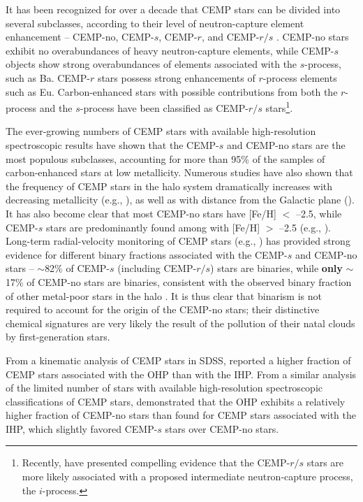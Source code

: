 \documentclass[iop]{emulateapj}
\begin{document}
It has been recognized for over a decade that CEMP stars can be divided
into several subclasses, according to their level of neutron-capture
element enhancement -- CEMP-no, CEMP-$s$, CEMP-$r$, and CEMP-$r/s$
\citep{beers2005}. CEMP-no stars exhibit no overabundances of heavy
neutron-capture elements, while CEMP-$s$ objects show strong
overabundances of elements associated with the $s$-process, such as Ba.
CEMP-$r$ stars possess strong enhancements of $r$-process elements
such as Eu.  Carbon-enhanced stars with possible contributions from
both the $r$-process and the $s$-process have been classified
as CEMP-$r/s$ stars\footnote[8]{Recently, \citet{hampel2016} have
presented compelling evidence that the CEMP-$r/s$ stars are more likely
associated with a proposed intermediate neutron-capture process, the
$i$-process.}.

The ever-growing numbers of CEMP stars with available high-resolution
spectroscopic results have shown that the CEMP-$s$ and CEMP-no stars are
the most populous subclasses, accounting for more than 95\% of the
samples of carbon-enhanced stars at low metallicity. Numerous studies
have also shown that the frequency of CEMP stars in the halo system
dramatically increases with decreasing metallicity (e.g.,
\citealt{lucatello2006, lee2013, yong2013, placco2014}), as well as with
distance from the Galactic plane (\citealt{frebel2006, carollo2012,
beers2016}). It has also become clear that most CEMP-no stars have [Fe/H]
$<$ --2.5, while CEMP-$s$ stars are predominantly found among
with [Fe/H] $>$ --2.5 (e.g., \citealt{aoki2007,
yoon2016}). Long-term radial-velocity monitoring of CEMP stars (e.g.,
\citealt{starkenburg2014, hansen2016a, hansen2016b, jorissen2016}) has provided
strong evidence for different binary fractions associated with the
CEMP-$s$ and CEMP-no stars -- $\sim$82\% of CEMP-$s$ (including
CEMP-$r/s$) stars are binaries, while \textbf{only} $\sim$17\% of CEMP-no stars are
binaries, consistent with the observed binary fraction of other
metal-poor stars in the halo \citep{carney2003}. It is thus clear
that binarism is not required to account for the origin of the CEMP-no
stars; their distinctive chemical signatures are very likely the result
of the pollution of their natal clouds by first-generation stars.

From a kinematic analysis of CEMP stars in SDSS, \citet{carollo2012}
reported a higher fraction of CEMP stars associated with the OHP than 
with the IHP. From a similar analysis of the limited number of
stars with available high-resolution spectroscopic classifications of
CEMP stars, \citet{carollo2014} demonstrated that the OHP exhibits a
relatively higher fraction of CEMP-no stars than found for CEMP stars
associated with the IHP, which slightly favored CEMP-$s$ stars over
CEMP-no stars.
\end{document}
